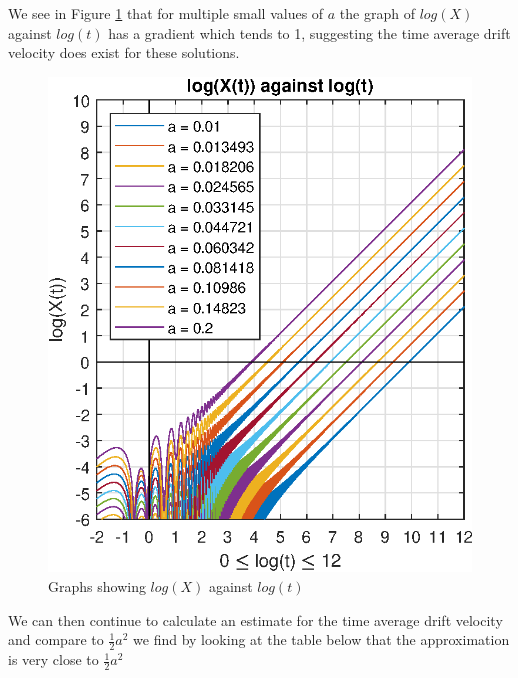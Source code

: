 \documentclass[11pt]{article} %
\begin{document}
We see in Figure \ref{fig:log_log} that for multiple small values of $a$ the graph of $log(X)$ against $log(t)$ has a gradient which tends to 1, suggesting the time average drift velocity does exist for these solutions.
\begin{figure}[h]
	\centering
	\includegraphics[scale=0.7]{"../Matlab Files/log graphs"}
	\caption{Graphs showing $log(X)$ against $log(t)$}
	\label{fig:log_log}
\end{figure}
We can then continue to calculate an estimate for the time average drift velocity and compare to $\frac{1}{2}a^2$ we find by looking at the table below that the approximation is very close to $\frac{1}{2}a^2$
\end{document}
